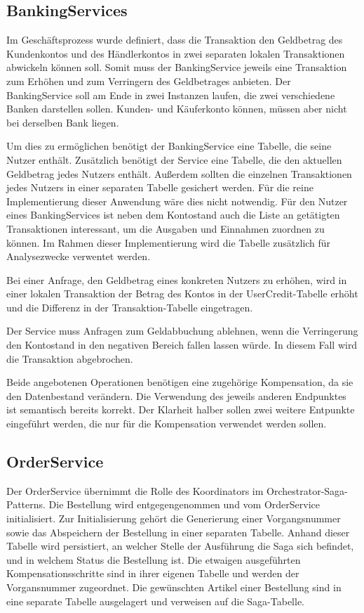 \subsection{BankingServices}
Im Geschäftsprozess wurde definiert, dass die Transaktion den Geldbetrag des Kundenkontos und des Händlerkontos in zwei separaten lokalen Transaktionen abwickeln können soll. Somit muss der BankingService jeweils eine Transaktion zum Erhöhen und zum Verringern des Geldbetrages anbieten. Der BankingService soll am Ende in zwei Instanzen laufen, die zwei verschiedene Banken darstellen sollen. Kunden- und Käuferkonto können, müssen aber nicht bei derselben Bank liegen. 

Um dies zu ermöglichen benötigt der BankingService eine Tabelle, die seine Nutzer enthält. Zusätzlich benötigt der Service eine Tabelle, die den aktuellen Geldbetrag jedes Nutzers enthält. Außerdem sollten die einzelnen Transaktionen jedes Nutzers in einer separaten Tabelle gesichert werden. Für die reine Implementierung dieser Anwendung wäre dies nicht notwendig. Für den Nutzer eines BankingServices ist neben dem Kontostand auch die Liste an getätigten Transaktionen interessant, um die Ausgaben und Einnahmen zuordnen zu können. Im Rahmen dieser Implementierung wird die Tabelle zusätzlich für Analysezwecke verwentet werden.
 
Bei einer Anfrage, den Geldbetrag eines konkreten Nutzers zu erhöhen, wird in einer lokalen Transaktion der Betrag des Kontos in der UserCredit-Tabelle erhöht und die Differenz in der Transaktion-Tabelle eingetragen. 

Der Service muss Anfragen zum Geldabbuchung ablehnen, wenn die Verringerung den Kontostand in den negativen Bereich fallen lassen würde. In diesem Fall wird die Transaktion abgebrochen.

Beide angebotenen Operationen benötigen eine zugehörige Kompensation, da sie den Datenbestand verändern. Die Verwendung des jeweils anderen Endpunktes ist semantisch bereits korrekt. Der Klarheit halber sollen zwei weitere Entpunkte eingeführt werden, die nur für die Kompensation verwendet werden sollen.

\subsection{OrderService}
Der OrderService übernimmt die Rolle des Koordinators im Orchestrator-Saga-Patterns. Die Bestellung wird entgegengenommen und vom OrderService initialisiert. Zur Initialisierung gehört die Generierung einer Vorgangsnummer sowie das Abspeichern der Bestellung in einer separaten Tabelle. Anhand dieser Tabelle wird persistiert, an welcher Stelle der Ausführung die Saga sich befindet, und in welchem Status die Bestellung ist. Die etwaigen ausgeführten Kompensationsschritte sind in ihrer eigenen Tabelle und werden der Vorgansnummer zugeordnet. Die gewünschten Artikel einer Bestellung sind in eine separate Tabelle ausgelagert und verweisen auf die Saga-Tabelle. 

